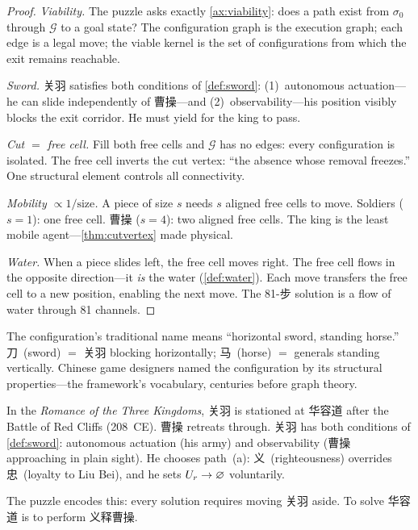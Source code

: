 \begin{proof}
\emph{Viability.} The puzzle asks exactly \cref{ax:viability}: does a
path exist from $\sigma_0$ through $\mathcal{G}$ to a goal state? The
configuration graph is the execution graph; each edge is a legal move;
the viable kernel is the set of configurations from which the exit
remains reachable.

\emph{Sword.} 关羽 satisfies both conditions of \cref{def:sword}:
(1)~autonomous actuation---he can slide independently of 曹操---and
(2)~observability---his position visibly blocks the exit corridor.
He must yield for the king to pass.

\emph{Cut $=$ free cell.} Fill both free cells and $\mathcal{G}$ has
no edges: every configuration is isolated. The free cell inverts the
cut vertex: ``the absence whose removal freezes.'' One structural
element controls all connectivity.

\emph{Mobility $\propto 1/\text{size}$.} A piece of size $s$ needs $s$
aligned free cells to move. Soldiers ($s = 1$): one free cell.
曹操 ($s = 4$): two aligned free cells. The king is the least mobile
agent---\cref{thm:cutvertex} made physical.

\emph{Water.} When a piece slides left, the free cell moves right.
The free cell flows in the opposite direction---it \emph{is} the water
(\cref{def:water}). Each move transfers the free cell to a new
position, enabling the next move. The 81-步 solution is a flow of
water through 81 channels.
\end{proof}

\begin{remark}\label{rem:hrdname}
The configuration's traditional name means ``horizontal sword, standing
horse.'' 刀~(sword) $=$ 关羽 blocking horizontally; 马~(horse) $=$
generals standing vertically. Chinese game designers named the
configuration by its structural properties---the framework's vocabulary,
centuries before graph theory.
\end{remark}

\begin{remark}[义释曹操]\label{rem:guanyu}
In the \emph{Romance of the Three Kingdoms}, 关羽 is stationed at
华容道 after the Battle of Red Cliffs (208~CE). 曹操 retreats through.
关羽 has both conditions of \cref{def:sword}: autonomous actuation
(his army) and observability (曹操 approaching in plain sight). He
chooses path~(a): 义~(righteousness) overrides 忠~(loyalty to Liu Bei),
and he sets $U_r \to \varnothing$ voluntarily.

The puzzle encodes this: every solution requires moving 关羽 aside.
To solve 华容道 is to perform 义释曹操.
\end{remark}

